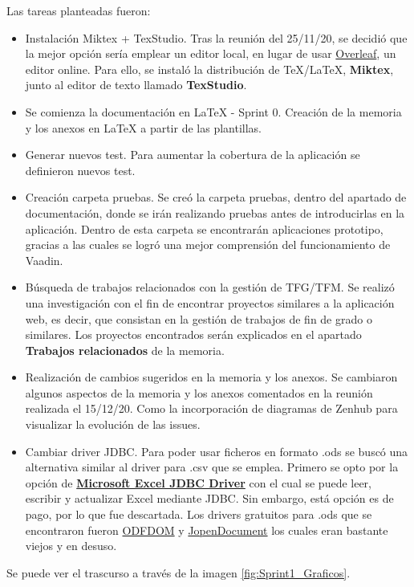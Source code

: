 Las tareas planteadas fueron:
\begin{itemize}
	\item Instalación Miktex + TexStudio. 
		Tras la reunión del 25/11/20, se decidió que la mejor opción sería emplear un editor local, en lugar de usar \href{https://es.overleaf.com/}{Overleaf}, un editor online. Para ello, se instaló la distribución de TeX/LaTeX, \textbf{Miktex}, junto al editor de texto llamado \textbf{TexStudio}.
	\item Se comienza la documentación en LaTeX  - Sprint 0. 
		Creación de la memoria y los anexos en LaTeX a partir de las plantillas.
	\item Generar nuevos test. 
		Para aumentar la cobertura de la aplicación se definieron nuevos test.
	\item Creación carpeta pruebas. 
		Se creó la carpeta pruebas, dentro del apartado de documentación, donde se irán realizando pruebas antes de introducirlas en la aplicación. Dentro de esta carpeta se encontrarán aplicaciones prototipo, gracias a las cuales se logró una mejor comprensión del funcionamiento de Vaadin.
	\item Búsqueda de trabajos relacionados con la gestión de TFG/TFM. 
		Se realizó una investigación con el fin de encontrar proyectos similares a la aplicación web, es decir, que consistan en la gestión de trabajos de fin de grado o similares. Los proyectos encontrados serán explicados en el apartado \textbf{Trabajos relacionados} de la memoria.
	\item Realización de cambios sugeridos en la memoria y los anexos. 
		Se cambiaron algunos aspectos de la memoria y los anexos comentados en la reunión realizada el 15/12/20. Como la incorporación de diagramas de Zenhub para visualizar la evolución de las issues.
	\item Cambiar driver JDBC. 
		Para poder usar ficheros en formato .ods se buscó una alternativa similar al driver para .csv que se emplea. Primero se opto por la opción de \textbf{\href{https://www.cdata.com/drivers/excel/jdbc/}{Microsoft Excel JDBC Driver}} con el cual se puede leer, escribir y actualizar Excel mediante JDBC. Sin embargo, está opción es de pago, por lo que fue descartada. Los drivers gratuitos para .ods que se encontraron fueron \href{https://odftoolkit.org/}{ODFDOM} y \href{http://www.jopendocument.org/}{JopenDocument} los cuales eran bastante viejos y en desuso. 
\end{itemize}

Se puede ver el trascurso a través de la imagen \ref{fig:Sprint1_Graficos}.


